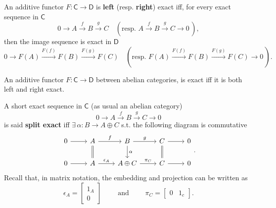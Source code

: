 \begin{defn}
	An additive functor $F: \mathsf{C} \to \mathsf{D}$ is \textbf{left} (resp. \textbf{right}) exact iff,
	for every exact sequence in $\mathsf{C}$
	\begin{equation}
		0 \to A \xrightarrow{f} B \xrightarrow{g} C \quad ( \text{resp. }
		A \xrightarrow{f} B \xrightarrow{g} C \to 0\, )
	,\end{equation} 
	then the image sequence is exact in $\mathsf{D}$ 
	\begin{equation}
		0 \to F(A) \xrightarrow{F(f)} F(B) \xrightarrow{F(g)} F(C) \quad ( \text{resp. }
		F(A) \xrightarrow{F(f)} F(B) \xrightarrow{F(g)} F(C) \to 0\, )
	.\end{equation} 
\end{defn}

\begin{prop}
	An additive functor $F: \mathsf{C} \to \mathsf{D}$ between abelian categories,
	is exact iff it is both left and right exact.
\end{prop} 

\begin{defn}
	A short exact sequence in $\mathsf{C}$ (as usual an abelian category)
	\begin{equation}
	0 \to A \xrightarrow{f} B \xrightarrow{g} C \to 0 
	\end{equation} 
	is said \textbf{split exact} iff $\exists\, \alpha: B \to A \oplus C$ s.t. the following diagram is commutative
	\begin{equation}
	\begin{tikzcd}
		0 \arrow[r, "", rightarrow] &
		A \arrow[r, "f", rightarrow] \arrow[d, "", equal] &
		B \arrow[r, "g", rightarrow] \arrow[d, "\alpha", rightarrow] &
		C \arrow[r, "", rightarrow] \arrow[d, "", equal] &
		0\\
		0 \arrow[r, "", rightarrow] &
		A \arrow[r, "\epsilon_A", rightarrow] &
		A \oplus C \arrow[r, "\pi_C", rightarrow] &
		C \arrow[r, "", rightarrow] &
		0
	\end{tikzcd}
	.\end{equation} 
	Recall that, in matrix notation, the embedding and projection can be written as
	 \begin{equation}
	\epsilon_A = 
	\begin{bmatrix}
		1_A\\ 0
	\end{bmatrix} \qquad \text{ and } \qquad
	\pi_C = 
	\begin{bmatrix}
		0 & 1_c
	\end{bmatrix} 
	.\end{equation} 
\end{defn}

